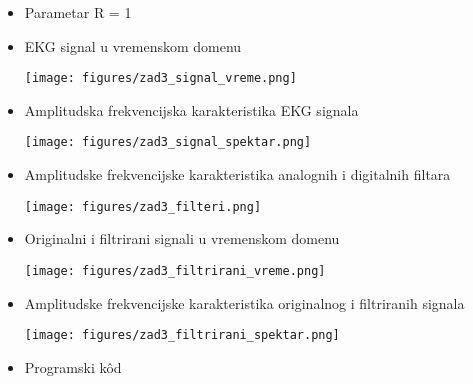 
\begin{itemize}
    \item Parametar R = 1
    \item EKG signal u vremenskom domenu
        \begin{center}
            \texttt{[image: figures/zad3\_signal\_vreme.png]}
        \end{center}
        
    \item Amplitudska frekvencijska karakteristika EKG signala
        \begin{center}
            \texttt{[image: figures/zad3\_signal\_spektar.png]}
        \end{center}
        
    \item Amplitudske frekvencijske karakteristika analognih i digitalnih filtara
        \begin{center}
            \texttt{[image: figures/zad3\_filteri.png]}
        \end{center}
        
    \item Originalni i filtrirani signali u vremenskom domenu
        \begin{center}
            \texttt{[image: figures/zad3\_filtrirani\_vreme.png]}
        \end{center}
        
    \item Amplitudske frekvencijske karakteristika originalnog i filtriranih signala
        \begin{center}
            \texttt{[image: figures/zad3\_filtrirani\_spektar.png]}
        \end{center}
        
    \item Programski k\^{o}d 
    
\end{itemize}